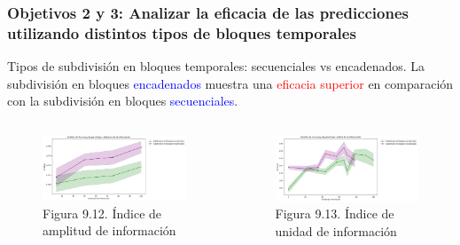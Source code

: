 \documentclass{beamer}
\begin{document}
\begin{frame}
	\frametitle{Objetivos 2 y 3: Analizar la eficacia de las predicciones utilizando distintos tipos de bloques temporales}
	\begin{block}{Tipos de subdivisión en bloques temporales: secuenciales vs encadenados.}
	La subdivisión en bloques \textcolor{blue}{encadenados} muestra una \textcolor{red}{eficacia superior} en comparación con la subdivisión en bloques \textcolor{blue}{secuenciales}.

	\end{block}
	
	\begin{columns}[c]
	\begin{column}{.5\textwidth}
		\begin{figure}
			\centering
			\includegraphics[width=1\textwidth]{figs/cap7/figura_15}
			\caption{Figura 9.12. Índice de amplitud de información}
		\end{figure}      
	\end{column}
	\begin{column}{.5\textwidth}
		\begin{figure}
			\centering
			\includegraphics[width=1\textwidth]{figs/cap7/figura_16}
			\caption{Figura 9.13. Índice de unidad de información}
		\end{figure}
	\end{column}
\end{columns}

\end{frame}
\end{document}
